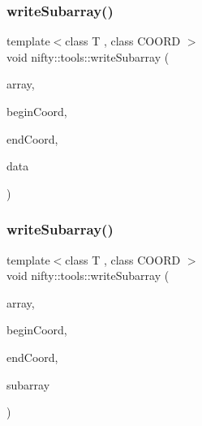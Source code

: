 \mbox{\label{namespacenifty_1_1tools_ace36c8be6273f83864c4b1b261eb25d3}} 
\subsubsection{\texorpdfstring{write\+Subarray()}{writeSubarray()}\hspace{0.1cm}{\footnotesize\ttfamily [1/2]}}
{\footnotesize\ttfamily template$<$class T , class C\+O\+O\+RD $>$ \\
void nifty\+::tools\+::write\+Subarray (\begin{DoxyParamCaption}\item[{\hyperlink{classandres_1_1View}{marray\+::\+View}$<$ T $>$}]{array,  }\item[{const C\+O\+O\+RD \&}]{begin\+Coord,  }\item[{const C\+O\+O\+RD \&}]{end\+Coord,  }\item[{const \hyperlink{classandres_1_1View}{marray\+::\+View}$<$ T $>$ \&}]{data }\end{DoxyParamCaption})\hspace{0.3cm}{\ttfamily [inline]}}

\mbox{\label{namespacenifty_1_1tools_a46fa9e03448a433ba5ca485435b540b8}} 
\subsubsection{\texorpdfstring{write\+Subarray()}{writeSubarray()}\hspace{0.1cm}{\footnotesize\ttfamily [2/2]}}
{\footnotesize\ttfamily template$<$class T , class C\+O\+O\+RD $>$ \\
void nifty\+::tools\+::write\+Subarray (\begin{DoxyParamCaption}\item[{hdf5\+::\+Hdf5\+Array$<$ T $>$ \&}]{array,  }\item[{const C\+O\+O\+RD \&}]{begin\+Coord,  }\item[{const C\+O\+O\+RD \&}]{end\+Coord,  }\item[{const \hyperlink{classandres_1_1View}{marray\+::\+View}$<$ T $>$ \&}]{subarray }\end{DoxyParamCaption})\hspace{0.3cm}{\ttfamily [inline]}}

